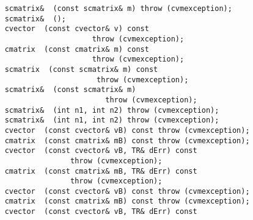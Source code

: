 \verb"    scmatrix& "\verb" (const scmatrix& m) throw (cvmexception);"\\
\verb"    scmatrix& "\verb" ();"\\
\verb"    cvector "\verb" (const cvector& v) const"\\
\verb"                        throw (cvmexception);"\\
\verb"    cmatrix "\verb" (const cmatrix& m) const"\\
\verb"                        throw (cvmexception);"\\
\verb"    scmatrix "\verb" (const scmatrix& m) const"\\
\verb"                         throw (cvmexception);"\\
\verb"    scmatrix& "\verb" (const scmatrix& m)"\\
\verb"                           throw (cvmexception);"\\
\verb"    scmatrix& "\verb" (int n1, int n2) throw (cvmexception);"\\
\verb"    scmatrix& "\verb" (int n1, int n2) throw (cvmexception);"\\
\verb"    cvector "\verb" (const cvector& vB) const throw (cvmexception);"\\
\verb"    cmatrix "\verb" (const cmatrix& mB) const throw (cvmexception);"\\
\verb"    cvector "\verb" (const cvector& vB, TR& dErr) const"\\
\verb"                   throw (cvmexception);"\\
\verb"    cmatrix "\verb" (const cmatrix& mB, TR& dErr) const"\\
\verb"                   throw (cvmexception);"\\
\verb"    cvector "\verb" (const cvector& vB) const throw (cvmexception);"\\
\verb"    cmatrix "\verb" (const cmatrix& mB) const throw (cvmexception);"\\
\verb"    cvector "\verb" (const cvector& vB, TR& dErr) const"\\
